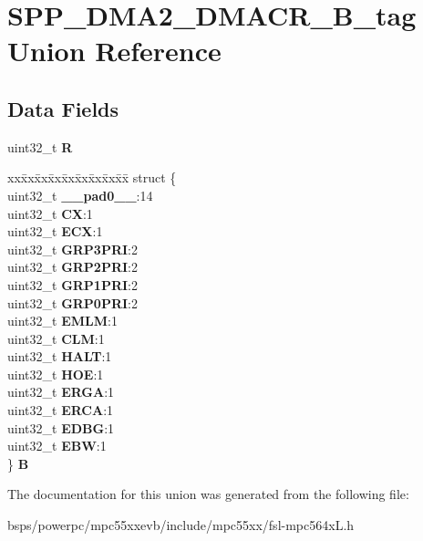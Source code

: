 \hypertarget{unionSPP__DMA2__DMACR__32B__tag}{}\section{S\+P\+P\+\_\+\+D\+M\+A2\+\_\+\+D\+M\+A\+C\+R\+\_\+B\+\_\+tag Union Reference}
\label{unionSPP__DMA2__DMACR__32B__tag}
\subsection*{Data Fields}
\begin{DoxyCompactItemize}
\item 
\mbox{\label{unionSPP__DMA2__DMACR__32B__tag_abc483afa35d08247fee24b77cb7b1d4f}} 
uint32\+\_\+t {\bfseries R}
\item 
\mbox{\label{unionSPP__DMA2__DMACR__32B__tag_a60505475e60f3ee09b489fed8959bcdc}} 
\begin{tabbing}
xx\=xx\=xx\=xx\=xx\=xx\=xx\=xx\=xx\=\kill
struct \{\\
\>uint32\_t {\bfseries \_\_pad0\_\_}:14\\
\>uint32\_t {\bfseries CX}:1\\
\>uint32\_t {\bfseries ECX}:1\\
\>uint32\_t {\bfseries GRP3PRI}:2\\
\>uint32\_t {\bfseries GRP2PRI}:2\\
\>uint32\_t {\bfseries GRP1PRI}:2\\
\>uint32\_t {\bfseries GRP0PRI}:2\\
\>uint32\_t {\bfseries EMLM}:1\\
\>uint32\_t {\bfseries CLM}:1\\
\>uint32\_t {\bfseries HALT}:1\\
\>uint32\_t {\bfseries HOE}:1\\
\>uint32\_t {\bfseries ERGA}:1\\
\>uint32\_t {\bfseries ERCA}:1\\
\>uint32\_t {\bfseries EDBG}:1\\
\>uint32\_t {\bfseries EBW}:1\\
\} {\bfseries B}\\

\end{tabbing}\end{DoxyCompactItemize}


The documentation for this union was generated from the following file\+:\begin{DoxyCompactItemize}
\item 
bsps/powerpc/mpc55xxevb/include/mpc55xx/fsl-\/mpc564x\+L.\+h\end{DoxyCompactItemize}
